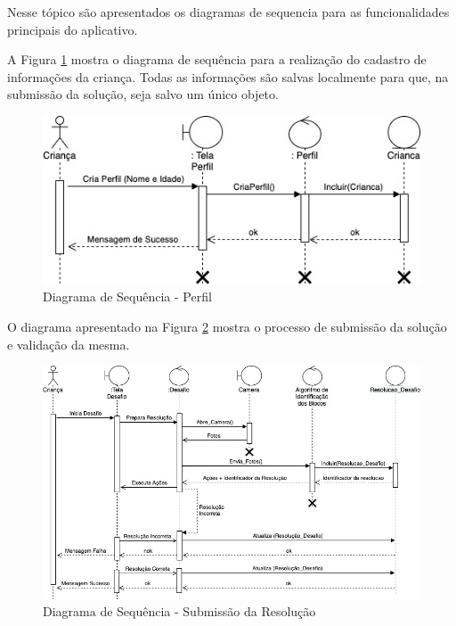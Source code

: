         Nesse tópico são apresentados os diagramas de sequencia para as funcionalidades principais do aplicativo.
        
        
        A Figura \ref{figura:sequencia_perfil} mostra o diagrama de sequência para a realização do cadastro de informações da criança. Todas as informações são salvas localmente para que, na submissão da solução, seja salvo um único objeto. 
        
        \begin{figure}[H]
            \caption{Diagrama de Sequência - Perfil}
            \centering
                \includegraphics[width=\linewidth]{Imagens/Cap3/Sequencia_Perfil.jpg}
    
            \label{figura:sequencia_perfil}
        \end{figure}
        
        
        O diagrama apresentado na Figura \ref{figura:sequencia_jogo} mostra o processo de submissão da solução e validação da mesma.
        
        \begin{figure}[H]
            \caption{Diagrama de Sequência - Submissão da Resolução}
            \centering
                \includegraphics[width=\linewidth]{Imagens/Cap3/Sequencia_Jogo.jpg}
    
            \label{figura:sequencia_jogo}
        \end{figure}
        
